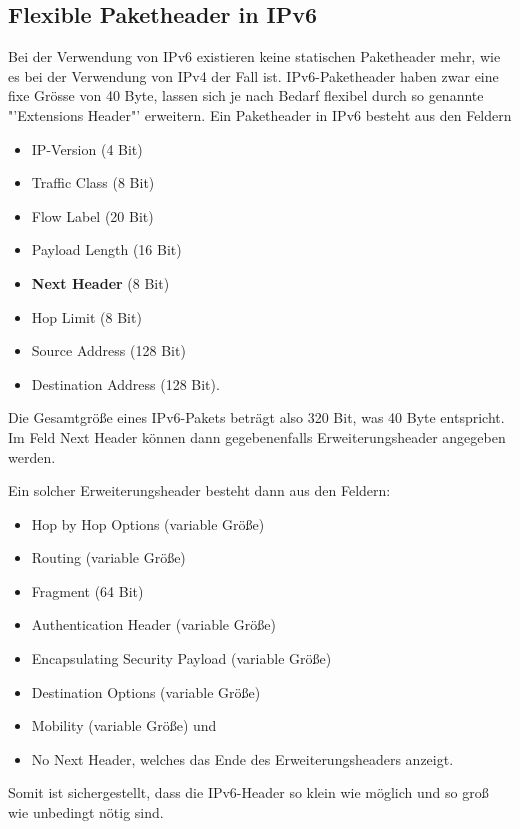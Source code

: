 \documentclass[a4paper,12pt]{scrartcl}
\begin{document}
\subsection{Flexible Paketheader in IPv6}
 Bei der Verwendung von IPv6 existieren keine statischen Paketheader mehr, wie es bei der Verwendung von IPv4 der Fall ist. IPv6-Paketheader haben zwar eine fixe Grösse von 40 Byte, lassen sich je nach Bedarf flexibel durch so genannte "'Extensions Header"' erweitern. 
Ein Paketheader in IPv6 besteht aus den Feldern 
\begin{itemize}
	\item IP-Version (4 Bit)
	\item Traffic Class (8 Bit)
	\item Flow Label (20 Bit)
	\item Payload Length (16 Bit)
	\item \textbf{Next Header} (8 Bit)
	\item Hop Limit (8 Bit)
	\item Source Address (128 Bit)
	\item Destination Address (128 Bit). 
\end{itemize}

Die Gesamtgr\"o{\ss}e eines IPv6-Pakets betr\"agt also 320 Bit, was 40 Byte entspricht. Im Feld Next Header können dann gegebenenfalls Erweiterungsheader angegeben werden.  

Ein solcher Erweiterungsheader besteht dann aus den Feldern:
\begin{itemize}
 	\item Hop by Hop Options (variable Gr\"o{\ss}e)
	\item  Routing  (variable Gr\"o{\ss}e)
	\item Fragment (64 Bit)
	\item Authentication Header (variable Gr\"o{\ss}e)
	\item Encapsulating Security Payload  (variable Gr\"o{\ss}e)
	\item Destination Options  (variable Gr\"o{\ss}e)
	\item Mobility  (variable Gr\"o{\ss}e) und 
	\item No Next Header, welches das Ende des Erweiterungsheaders anzeigt. 
\end{itemize}

Somit ist sichergestellt, dass die IPv6-Header so klein wie möglich und so groß wie unbedingt nötig sind.  
\end{document}
